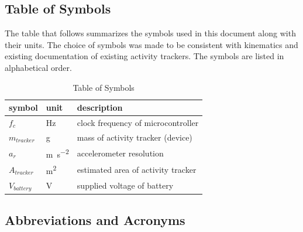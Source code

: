 \documentclass[12pt]{article}
\begin{document}
\subsection{Table of Symbols}

The table that follows summarizes the symbols used in this document along with
their units.  The choice of symbols was made to be consistent with kinematics and existing documentation of existing activity trackers. The symbols are listed in alphabetical order.

\renewcommand{\arraystretch}{1.2}

\begin{table}[H]
	\noindent\begin{longtable*}{l l p{12cm}} \toprule
	
	\textbf{symbol} & \textbf{unit} & \textbf{description}\\
	\midrule
	$f_c$ & \si{\Hz} & clock frequency of microcontroller\\
	$m_{tracker}$ & \si\g & mass of activity tracker (device)\\
	$a_r$ & \si{\metre\per\square\second} & accelerometer resolution\\
	$A_{tracker}$ & \si[per-mode=symbol] {\square\metre} & estimated area of activity tracker\\
	$V_{battery}$ & \si\V & supplied voltage of battery\\
	
	\bottomrule
	\end{longtable*}
	\caption{\label{symb}Table of Symbols}  
\end{table}

\subsection{Abbreviations and Acronyms}
\end{document}
